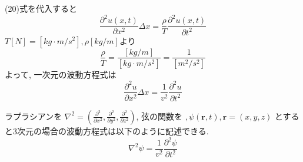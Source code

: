 \documentclass{ltjsarticle}
\begin{document}
(20)式を代入すると
\begin{equation}
  \frac{\partial^2 u(x ,t)}{\partial x^2} \Delta x= \frac{\rho}{T} \frac{\partial^2 u(x ,t)}{\partial t^2}
\end{equation}
$T[N]=[kg \cdot m/s^2], \rho [kg/m]$より
\begin{equation}
  \frac{\rho}{T}=\frac{[kg/m]}{[kg \cdot m/s^2]}=\frac{1}{[m^2/s^2]}
\end{equation}
よって, 一次元の波動方程式は
\begin{equation}
  \frac{\partial^2 u}{\partial x^2} \Delta x= \frac{1}{v^2} \frac{\partial^2 u}{\partial t^2}
\end{equation}

ラプラシアンを
$
\nabla^2 = \left( \frac{\partial^2}{\partial x^2}, \frac{\partial^2}{\partial y^2}, \frac{\partial^2}{\partial z^2} \right)
$, 弦の関数を
$
, \psi (\mathbf{r}, t), \mathbf{r} = (x, y, z)
$
とすると3次元の場合の波動方程式は以下のように記述できる. 
\begin{equation}
  \nabla^2 \psi= \frac{1}{v^2} \frac{\partial^2 \psi}{\partial t^2}
\end{equation}




\end{document}
